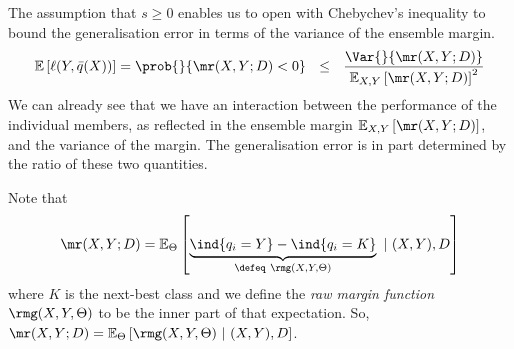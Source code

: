 \documentclass[
	twoside=false, %
]{kaobook}
\begin{document}
The assumption that $s \geq 0$ enables us to open with Chebychev's inequality to bound the generalisation error in terms of the variance of the ensemble margin. 
$$
\mathbb{E}\left[ \ell(Y, \bar{q}(X)) \right]  = \prob{}{\mr(X, Y; D) < 0 }  ~ ~ \leq ~ ~ \frac{\Var{}{\mr(X, Y; D)  }}{\mathbb{E}_{X,Y}\left[ \mr(X, Y; D)  \right]^2}
$$
We can already see that we have an interaction between the performance of the individual members, as reflected in the ensemble margin $\mathbb{E}_{X,Y}\left[ \mr(X, Y; D)  \right]$, and the variance of the margin.
The generalisation error is in part determined by the ratio of these two quantities.

Note that
$$
\mr(X, Y;D) = \mathbb{E}_{\Theta}\left[ 
\underbrace{
\ind{q_{i}=Y} - \ind{q_{i}=K} 
}_{
\defeq ~\rmg(X, Y, \Theta) 
}
~|~(X,Y), D \right] 
$$
where $K$ is the next-best class and we define the \textit{raw margin function} $\rmg(X, Y, \Theta)$ to be the inner part of that expectation. So, 
$\mr(X, Y;D) = \mathbb{E}_{\Theta}\left[ 
\rmg(X, Y, \Theta) 
~|~(X,Y), D \right]$. 
\end{document}
